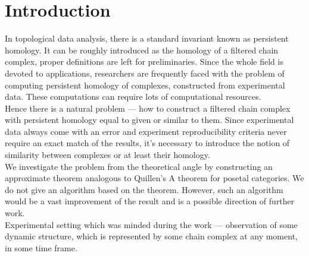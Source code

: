 \documentclass[a4paper, 12pt]{article}
\numberwithin{equation}{section}
\theoremstyle{definition}
\theoremstyle{remark}
\begin{document}
\section{Introduction}

In topological data analysis, there is a standard invariant known as persistent homology. It can be roughly introduced as the homology of a filtered chain complex, proper definitions are left for preliminaries. Since the whole field is devoted to applications, researchers are frequently faced with the problem of computing persistent homology of complexes, constructed from experimental data. These computations can require lots of computational resources.\\

Hence there is a natural problem --- how to construct a filtered chain complex with persistent homology equal to given or similar to them. Since experimental data always come with an error and experiment reproducibility criteria never require an exact match of the results, it's necessary to introduce the notion of similarity between complexes or at least their homology.\\

We investigate the problem from the theoretical angle by constructing an approximate theorem analogous to Quillen's A theorem for posetal categories. We do not give an algorithm based on the theorem. However, such an algorithm would be a vast improvement of the result and is a possible direction of further work.\\

Experimental setting which was minded during the work --- observation of some dynamic structure, which is represented by some chain complex at any moment, in some time frame.\\
\end{document}
